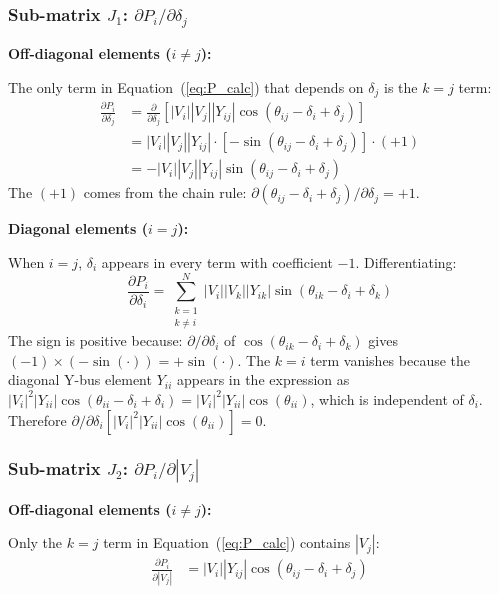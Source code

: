 \documentclass[12pt, a4paper]{article}
\begin{document}
\subsubsection{Sub-matrix \texorpdfstring{$J_1$: $\partial P_i / \partial \delta_j$}{J1: dPi/ddeltaj}}

\textbf{Off-diagonal elements ($i \neq j$):}

The only term in Equation~(\ref{eq:P_calc}) that depends on $\delta_j$ is the $k = j$ term:
\begin{align}
\frac{\partial P_i}{\partial \delta_j} &= \frac{\partial}{\partial \delta_j} \left[ |V_i| |V_j| |Y_{ij}| \cos(\theta_{ij} - \delta_i + \delta_j) \right] \nonumber \\
&= |V_i| |V_j| |Y_{ij}| \cdot \left[ -\sin(\theta_{ij} - \delta_i + \delta_j) \right] \cdot (+1) \nonumber \\
&= -|V_i| |V_j| |Y_{ij}| \sin(\theta_{ij} - \delta_i + \delta_j) \label{eq:J1_offdiag}
\end{align}
The $(+1)$ comes from the chain rule: $\partial(\theta_{ij} - \delta_i + \delta_j)/\partial \delta_j = +1$.

\textbf{Diagonal elements ($i = j$):}

When $i = j$, $\delta_i$ appears in every term with coefficient $-1$. Differentiating:
\begin{equation}
\frac{\partial P_i}{\partial \delta_i} = \sum_{\substack{k=1 \\ k \neq i}}^{N} |V_i| |V_k| |Y_{ik}| \sin(\theta_{ik} - \delta_i + \delta_k)
\label{eq:J1_diag}
\end{equation}
The sign is positive because: $\partial/\partial\delta_i$ of $\cos(\theta_{ik} - \delta_i + \delta_k)$ gives $(-1)\times(-\sin(\cdot)) = +\sin(\cdot)$. The $k = i$ term vanishes because the diagonal Y-bus element $Y_{ii}$ appears in the expression as $|V_i|^2 |Y_{ii}| \cos(\theta_{ii} - \delta_i + \delta_i) = |V_i|^2 |Y_{ii}| \cos(\theta_{ii})$, which is independent of $\delta_i$. Therefore $\partial/\partial\delta_i \left[ |V_i|^2 |Y_{ii}| \cos(\theta_{ii}) \right] = 0$.

\subsubsection{Sub-matrix \texorpdfstring{$J_2$: $\partial P_i / \partial |V_j|$}{J2: dPi/d|Vj|}}

\textbf{Off-diagonal elements ($i \neq j$):}

Only the $k = j$ term in Equation~(\ref{eq:P_calc}) contains $|V_j|$:
\begin{align}
\frac{\partial P_i}{\partial |V_j|} &= |V_i| |Y_{ij}| \cos(\theta_{ij} - \delta_i + \delta_j) \label{eq:J2_offdiag}
\end{align}
\end{document}

